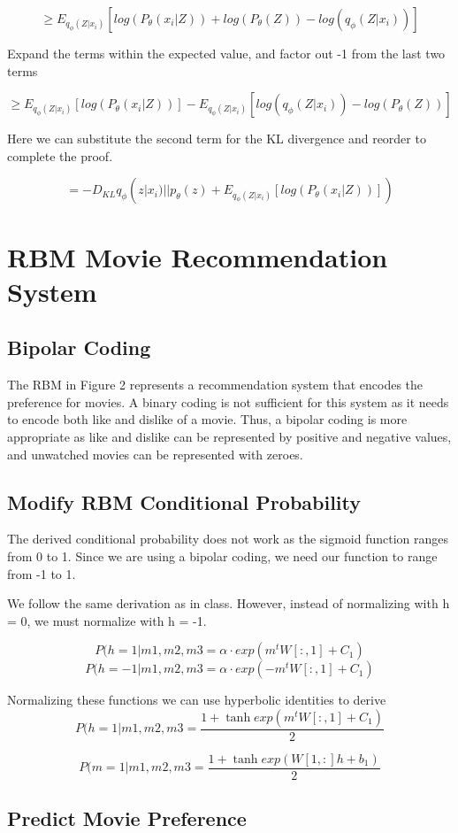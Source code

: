 \documentclass{article}
\begin{document}
\[ \geq E_{q_\phi (Z | x_i)} [log (P_\theta(x_i | Z)) + log(P_\theta(Z)) - log (q_\phi (Z | x_i))]\]

Expand the terms within the expected value, and factor out -1 from the last two terms

\[ \geq E_{q_\phi (Z | x_i)} [log (P_\theta(x_i | Z))] - E_{q_\phi (Z | x_i)}[log (q_\phi (Z | x_i)) - log(P_\theta(Z))]\]

Here we can substitute the second term for the KL divergence and reorder to complete the proof.

\[ = - D_{KL}q_\phi(z|x_i) || p_\theta(z) + E_{q_\phi (Z | x_i)} [log (P_\theta(x_i | Z))] )\]

\section{RBM Movie Recommendation System}
\subsection{Bipolar Coding}
The RBM in Figure 2 represents a recommendation system that encodes the preference for movies. A binary coding is not sufficient for this system as it needs to encode both like and dislike of a movie. Thus, a bipolar coding is more appropriate as like and dislike can be represented by positive and negative values, and unwatched movies can be represented with zeroes.

\subsection{Modify RBM Conditional Probability}
The derived conditional probability does not work as the sigmoid function ranges from 0 to 1. Since we are using a bipolar coding, we need our function to range from -1 to 1.

We follow the same derivation as in class. However, instead of normalizing with h = 0, we must normalize with h = -1.

\[P(h=1 | m1, m2, m3 = \alpha\cdot exp (m^t W[:,1] + C_1)\]
\[P(h=-1 | m1, m2, m3 = \alpha\cdot exp (-m^t W[:,1] + C_1)\]

Normalizing these functions we can use hyperbolic identities to derive
\[P(h=1 | m1, m2, m3 = \frac{1+\tanh{exp (m^t W[:,1] + C_1)}}{2}\]

\[P(m=1 | m1, m2, m3 = \frac{1+\tanh{exp (W[1,:]h + b_1)}}{2}\]

\subsection{Predict Movie Preference}
\end{document}

